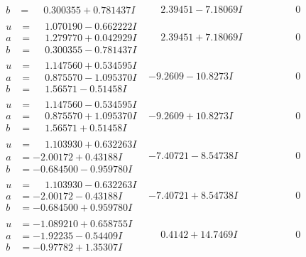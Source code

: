 \documentclass[1p]{elsarticle_modified}
\theoremstyle{definition}
\begin{document}
$$\begin{array}{c|c|c}
\begin{aligned}
b &= \phantom{-}0.300355 + 0.781437 I\end{aligned}
 & \phantom{-}2.39451 - 7.18069 I & \phantom{-0.000000 } 0 \\ \hline\begin{aligned}
u &= \phantom{-}1.070190 - 0.662222 I \\
a &= \phantom{-}1.279770 + 0.042929 I \\
b &= \phantom{-}0.300355 - 0.781437 I\end{aligned}
 & \phantom{-}2.39451 + 7.18069 I & \phantom{-0.000000 } 0 \\ \hline\begin{aligned}
u &= \phantom{-}1.147560 + 0.534595 I \\
a &= \phantom{-}0.875570 - 1.095370 I \\
b &= \phantom{-}1.56571 - 0.51458 I\end{aligned}
 & -9.2609 - 10.8273 I & \phantom{-0.000000 } 0 \\ \hline\begin{aligned}
u &= \phantom{-}1.147560 - 0.534595 I \\
a &= \phantom{-}0.875570 + 1.095370 I \\
b &= \phantom{-}1.56571 + 0.51458 I\end{aligned}
 & -9.2609 + 10.8273 I & \phantom{-0.000000 } 0 \\ \hline\begin{aligned}
u &= \phantom{-}1.103930 + 0.632263 I \\
a &= -2.00172 + 0.43188 I \\
b &= -0.684500 - 0.959780 I\end{aligned}
 & -7.40721 - 8.54738 I & \phantom{-0.000000 } 0 \\ \hline\begin{aligned}
u &= \phantom{-}1.103930 - 0.632263 I \\
a &= -2.00172 - 0.43188 I \\
b &= -0.684500 + 0.959780 I\end{aligned}
 & -7.40721 + 8.54738 I & \phantom{-0.000000 } 0 \\ \hline\begin{aligned}
u &= -1.089210 + 0.658755 I \\
a &= -1.92235 - 0.54409 I \\
b &= -0.97782 + 1.35307 I\end{aligned}
 & \phantom{-}0.4142 + 14.7469 I & \phantom{-0.000000 } 0 \\ \hline\begin{aligned}

\end{aligned}
\end{array}$$
\end{document}
